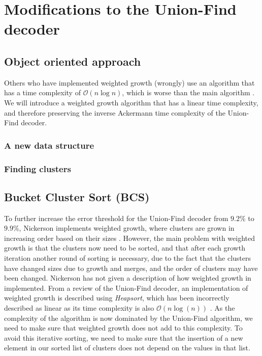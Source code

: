 \chapter{Modifications to the Union-Find decoder}


\section{Object oriented approach}

Others who have implemented weighted growth (wrongly) use an algorithm that has a time complexity of $\mathcal{O}(n\log n)$, which is worse than the main algorithm \cite{nando}. We will introduce a weighted growth algorithm that has a linear time complexity, and therefore preserving the inverse Ackermann time complexity of the Union-Find decoder.

\subsection{A new data structure}

\subsection{Finding clusters}

\section{Bucket Cluster Sort (BCS)}
To further increase the error threshold for the Union-Find decoder from $9.2\%$ to $9.9\%$, Nickerson implements weighted growth, where clusters are grown in increasing order based on their sizes \cite{delfosse2017}. However, the main problem with weighted growth is that the clusters now need to be sorted, and that after each growth iteration another round of sorting is necessary, due to the fact that the clusters have changed sizes due to growth and merges, and the order of clusters may have been changed. Nickerson has not given a description of how weighted growth in implemented. From a review of the Union-Find decoder, an implementation of weighted growth is described using \emph{Heapsort}, which has been incorrectly described as linear as its time complexity is also $\mathcal{O}(n\log(n))$ \cite{nando}. As the complexity of the algorithm is now dominated by the Union-Find algorithm, we need to make sure that weighted growth does not add to this complexity. To avoid this iterative sorting, we need to make sure that the insertion of a new element in our sorted list of clusters does not depend on the values in that list.

